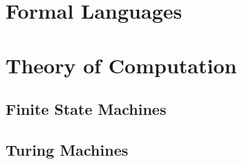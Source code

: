 
\section{Formal Languages}




\section{Theory of Computation}

\subsection{Finite State Machines}

\subsection{Turing Machines}




